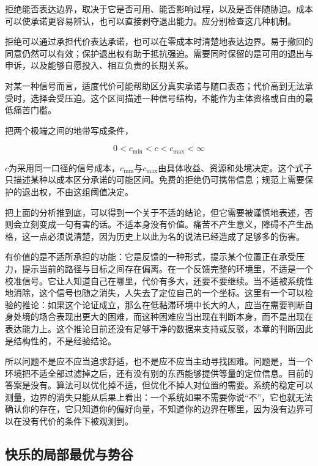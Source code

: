 
拒绝能否表达边界，取决于它是否可用、能否影响过程，以及是否伴随胁迫。成本可以使承诺更容易辨认，也可以直接剥夺退出能力。应分别检查这几种机制。

拒绝可以通过承担代价表达承诺，也可以在零成本时清楚地表达边界。易于撤回的同意仍然可以有效；保护退出权有助于抵抗强迫。需要同时保留的是可用的退出与申诉，以及能够自愿投入、相互负责的长期关系。

 对某一种信号而言，适度代价可能帮助区分真实承诺与随口表态；代价高到无法承受时，选择会受压迫。这个区间描述一种信号结构，不能作为主体资格或自由的最低痛苦门槛。

把两个极端之间的地带写成条件，

\begin{equation}
0<c_{\min}<c<c_{\max}<\infty
\end{equation}

$c$为采用同一口径的信号成本，$c_{\min}$与$c_{\max}$由具体收益、资源和处境决定。这个式子只描述某种以成本区分承诺的可能区间。免费的拒绝仍可携带信息；规范上需要保护的退出权，不由这组阈值决定。


把上面的分析推到底，可以得到一个关于不适的结论，但它需要被谨慎地表述，否则会立刻变成一句有害的话。不适本身没有价值。痛苦不产生意义，障碍不产生品格，这一点必须说清楚，因为历史上以此为名的说法已经造成了足够多的伤害。

有价值的是不适所承担的功能：它是反馈的一种形式，提示某个位置正在承受压力，提示当前的路径与目标之间存在偏离。在一个反馈完整的环境里，不适是一个校准信号。它让人知道自己在哪里，代价有多大，还要不要继续。当不适被系统性地消除，这个信号也随之消失，人失去了定位自己的一个坐标。这里有一个可以检验的推论：如果这个论证成立，那么在低黏滞环境中长大的人，应当在需要判断自身处境的场合表现出更大的困难，而这种困难应当出现在判断本身，而不是出现在表达能力上。这个推论目前还没有足够干净的数据来支持或反驳，本章的判断因此是结构性的，不是经验结论。

所以问题不是应不应当追求舒适，也不是应不应当主动寻找困难。问题是，当一个环境把不适全部过滤掉之后，还有没有别的东西能够提供等量的定位信息。目前的答案是没有。算法可以优化掉不适，但优化不掉人对位置的需要。系统的稳定可以测量，边界的消失只能从后果上看出：一个系统如果不需要你说“不”，它也就无法确认你的存在，它只知道你的偏好向量，不知道你的边界在哪里，因为没有边界可以在没有代价的条件下被观测到。

\subsection{快乐的局部最优与势谷}

